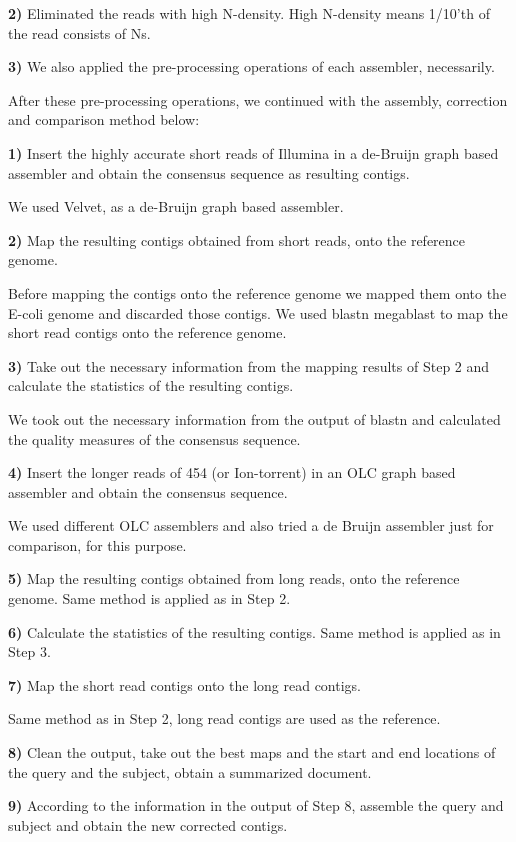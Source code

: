\documentclass{bioinfo}
\begin{document}
\textbf{2)} Eliminated the reads with high N-density. High N-density means 1/10'th of the read consists of Ns. 

\textbf{3)} We also applied the pre-processing operations of each assembler, necessarily.

After these pre-processing operations, we continued with the assembly, correction and comparison method below:

\textbf{1)} Insert the highly accurate short reads of Illumina in a de-Bruijn graph based assembler and obtain the consensus sequence as resulting contigs.

We used Velvet\cite{velvetZerbino:2008}, as a de-Bruijn graph based assembler.

\textbf{2)} Map the resulting contigs obtained from short reads, onto the reference genome. 

Before mapping the contigs onto the reference genome we mapped them onto the E-coli genome and discarded those contigs. We used blastn megablast \cite{blast} to map the short read contigs onto the reference genome.

\textbf{3)} Take out the necessary information from the mapping results of Step 2 and calculate the statistics of the resulting contigs.

We took out the necessary information from the output of blastn and calculated the quality measures of the consensus sequence.

\textbf{4)} Insert the longer reads of 454 (or Ion-torrent) in an OLC graph based assembler and obtain the consensus sequence.

We used different OLC assemblers \cite{celera:2000,sga:2012} and also tried a de Bruijn assembler \cite{spadesBankevich:2012} just for comparison, for this purpose.

\textbf{5)} Map the resulting contigs obtained from long reads, onto the reference genome. Same method is applied as in Step 2.

\textbf{6)} Calculate the statistics of the resulting contigs. Same method is applied as in Step 3.

\textbf{7)} Map the short read contigs onto the long read contigs. 

Same method as in Step 2, long read contigs are used as the reference.

\textbf{8)} Clean the output, take out the best maps and the start and end locations of the query and the subject, obtain a summarized document.

\textbf{9)} According to the information in the output of Step 8, assemble the query and subject and obtain the new corrected contigs.
\end{document}
